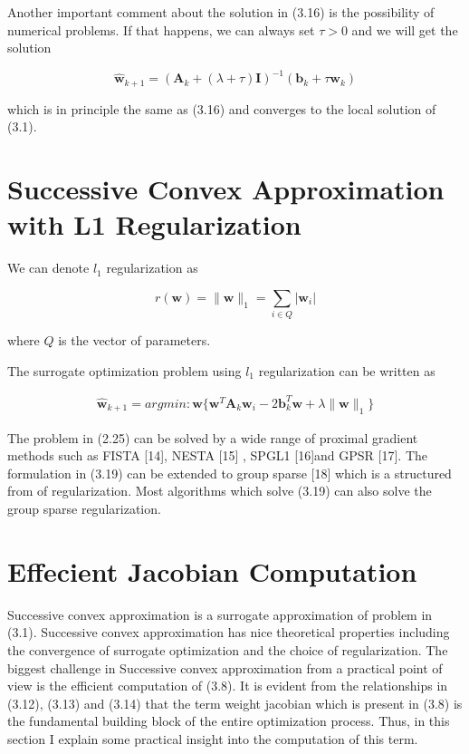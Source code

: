 Another important comment about the solution in (3.16) is the possibility of numerical problems. If that happens, we can always set $\tau > 0$ and we will get the solution

\begin{equation}
\hat{\textbf{w}}_{k+1} = \left( \textbf{A}_k + (\lambda+\tau) \textbf{I} \right)^{-1} (\textbf{b}_k+\tau \textbf{w}_k)
\end{equation}

which is in principle the same as (3.16) and converges to the local solution of (3.1). 


\newpage
\section {Successive Convex Approximation with L1 Regularization}

We can denote $l_1$ regularization as

\begin{equation}
r(\textbf{w}) = \|\textbf{w}\|_{1} = \sum_{i\in Q} |\textbf{w}_i|
\end{equation}

where $Q$ is the vector of parameters.

The surrogate optimization problem using $l_1$ regularization can be written as

\begin{equation}
\begin{aligned}
\hat{\textbf{w}}_{k+1} = argmin : \textbf{w}  \lbrace \textbf{w}^T \textbf{A}_{k} \textbf{w}_i - 2 \textbf{b}_k^T \textbf{w} + \lambda \|\textbf{w}\|_1\rbrace
\end{aligned}
\end{equation}

The problem in (2.25) can be solved by a wide range of proximal gradient methods such as FISTA [14], NESTA [15] , SPGL1 [16]and GPSR [17]. The formulation in (3.19) can be extended to group sparse [18] which is a structured from of regularization. Most algorithms which solve (3.19) can also solve the group sparse regularization.

\section {Effecient Jacobian Computation} 

Successive convex approximation is a surrogate approximation of problem in (3.1). Successive convex approximation has nice theoretical properties including the convergence of surrogate optimization and the choice of regularization. The biggest challenge in Successive convex approximation from a practical point of view is the efficient computation of (3.8). It is evident from the relationships in (3.12), (3.13) and (3.14) that the term weight jacobian which is present in (3.8) is the fundamental building block of the entire optimization process. Thus, in this section I explain some practical insight into the computation of this term. 

